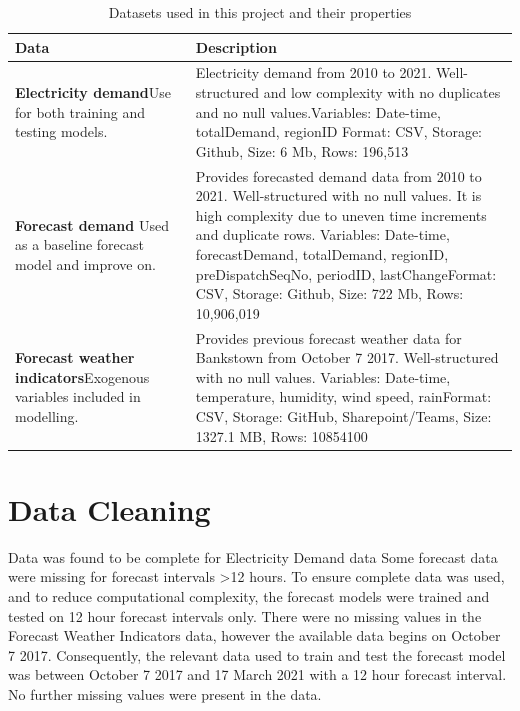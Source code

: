 \documentclass[mstat,12pt]{unswthesis}
\begin{document}
\begin{table}[H]
\caption{Datasets used in this project and their properties}
\centering
\begin{tabular}{|p{13em}|p{20em}|}
\hline
\textbf{Data} & \textbf{Description} \\
\hline
\textbf{Electricity demand}\newline Use for both training and testing models. & Electricity demand from 2010 to 2021. Well-structured and low complexity with no duplicates and no null values.\newline Variables: Date-time, totalDemand, regionID\newline
Format: CSV, Storage: Github, Size: 6 Mb, Rows: 196,513 \\
\hline
\textbf{Forecast demand} \newline Used as a baseline forecast model and improve on. & Provides forecasted demand data from 2010 to 2021. Well-structured with no null values. It is high complexity due to uneven time increments and duplicate rows. \newline Variables: Date-time, forecastDemand, totalDemand, regionID, preDispatchSeqNo, periodID, lastChange\newline Format: CSV, Storage: Github, Size: 722 Mb, Rows: 10,906,019 \\
\hline
\textbf{Forecast weather indicators}\newline Exogenous variables included in modelling. & Provides previous forecast weather data for Bankstown from October 7 2017. Well-structured with no null values. \newline Variables: Date-time, temperature, humidity, wind speed, rain\newline Format: CSV, Storage: GitHub, Sharepoint/Teams, Size: 1327.1 MB, Rows: 10854100 \\ 
\hline
\end{tabular}
\label{tab:tab2}
\end{table}

\section{Data Cleaning}\label{data-cleaning}

Data was found to be complete for Electricity Demand data Some forecast data were missing for forecast intervals \textgreater12 hours. To ensure complete data was used, and to reduce computational complexity, the forecast models were trained and tested on 12 hour forecast intervals only. There were no missing values in the Forecast Weather Indicators data, however the available data begins on October 7 2017. Consequently, the relevant data used to train and test the forecast model was between October 7 2017 and 17 March 2021 with a 12 hour forecast interval. No further missing values were present in the data.
\end{document}
